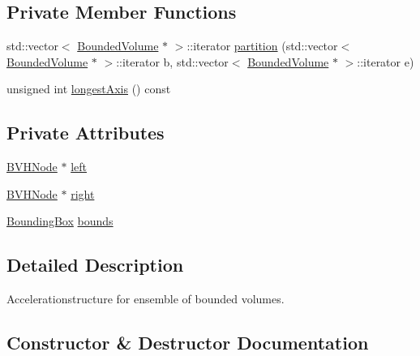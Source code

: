 \subsection*{Private Member Functions}
\begin{DoxyCompactItemize}
\item 
std\+::vector$<$ \hyperlink{classBoundedVolume}{Bounded\+Volume} $\ast$ $>$\+::iterator \hyperlink{classBinaryVolumeHierarchy_ab30dec4aa6ef808f53bbdedb98d8af65}{partition} (std\+::vector$<$ \hyperlink{classBoundedVolume}{Bounded\+Volume} $\ast$ $>$\+::iterator b, std\+::vector$<$ \hyperlink{classBoundedVolume}{Bounded\+Volume} $\ast$ $>$\+::iterator e)
\item 
unsigned int \hyperlink{classBinaryVolumeHierarchy_a93e3d7fd0b06a83675e36594d3fcaa8b}{longest\+Axis} () const 
\end{DoxyCompactItemize}
\subsection*{Private Attributes}
\begin{DoxyCompactItemize}
\item 
\hyperlink{structBVHNode}{B\+V\+H\+Node} $\ast$ \hyperlink{classBinaryVolumeHierarchy_a76372fd6f7d6a5783d9b8688fc40d5b4}{left}
\item 
\hyperlink{structBVHNode}{B\+V\+H\+Node} $\ast$ \hyperlink{classBinaryVolumeHierarchy_a3b950d10a084fedfeaa02727d654b782}{right}
\item 
\hyperlink{classBoundingBox}{Bounding\+Box} \hyperlink{classBinaryVolumeHierarchy_a2722a35a0c3c6fee488f186c31869b53}{bounds}
\end{DoxyCompactItemize}


\subsection{Detailed Description}
Accelerationstructure for ensemble of bounded volumes. 

\subsection{Constructor \& Destructor Documentation}
